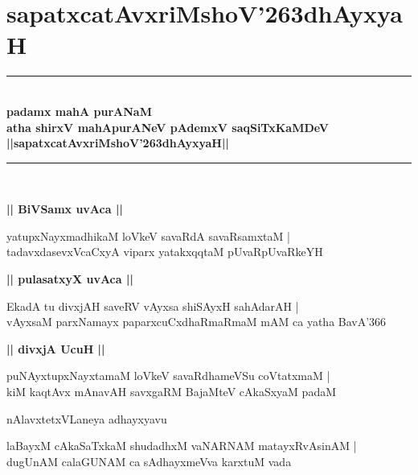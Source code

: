 \documentclass[twoside,12pt,openright]{book}
\def\S{\char'263}
\newcounter{shloka}[chapter]
\def\uvaca#1{\centerline{{\large\textbf{#1}}}}
\begin{document}

\frontmatter

\tableofcontents

\mainmatter
\begin{center}

\end{center}
\chapter{sapatxcatAvxriMshoV\S dhAyxyaH}
\begin{center}
\rule{2cm}{1pt}\\[.5cm]
{\huge\bfseries  padamx mahA purANaM }\\[.3cm]
{\Large\bfseries  atha shirxV mahApurANeV pAdemxV saqSiTxKaMDeV}\\[.3cm]
{\LARGE\bfseries ||sapatxcatAvxriMshoV\S dhAyxyaH||}\\[.3cm]
\rule{2cm}{1pt}\\
\end{center}

\uvaca{|| BiVSamx uvAca ||}

\begin{shloka}%
yatupxNayxmadhikaM loVkeV savaRdA savaRsamxtaM |\\
tadavxdasevxVcaCxyA viparx yatakxqqtaM pUvaRpUvaRkeYH
\end{shloka}

\uvaca{|| pulasatxyX uvAca ||}

\begin{shloka}%
EkadA tu divxjAH saveRV vAyxsa shiSAyxH sahAdarAH |\\
vAyxsaM parxNamayx paparxcuCxdhaRmaRmaM mAM ca yatha BavA\char'366
\end{shloka}

\uvaca {|| divxjA UcuH ||}

\begin{shloka}%
puNAyxtupxNayxtamaM loVkeV savaRdhameVSu coVtatxmaM |\\
kiM kaqtAvx mAnavAH savxgaRM BajaMteV cAkaSxyaM padaM 
\end{shloka}

\begin{center}
nAlavxtetxVLaneya adhayxyavu
\end{center}

\begin{shloka}%
laBayxM cAkaSaTxkaM shudadhxM vaNARNAM matayxRvAsinAM |\\
dugUnAM calaGUNAM ca sAdhayxmeVva karxtuM vada
\end{shloka}
\end{document}
